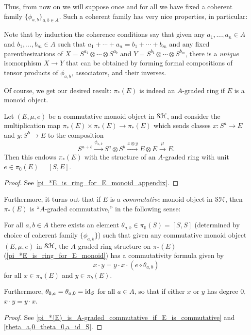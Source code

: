 \documentclass[../main.tex]{subfiles}
\begin{document}
Thus, from now on we will suppose once and for all we have fixed a coherent family $\{\phi_{a,b}\}_{a,b\in A}$. Such a coherent family has very nice properties, in particular:

\begin{remark}\label{unique_comp_Sas}
	Note that by induction the coherence conditions say that given any $a_1,\ldots,a_n\in A$ and $b_1,\ldots,b_m\in A$ such that $a_1+\cdots+a_n=b_1+\cdots+b_m$ and any fixed parenthesizations of $X=S^{a_1}\otimes\cdots\otimes S^{a_b}$ and $Y=S^{b_1}\otimes\cdots\otimes S^{b_m}$, there is a \emph{unique} isomorphism $X\to Y$ that can be obtained by forming formal compositions of tensor products of $\phi_{a,b}$, associators, and their inverses.
\end{remark}

Of course, we get our desired result: $\pi_*(E)$ is indeed an $A$-graded ring if $E$ is a monoid object.

\begin{proposition}\label{pi_*E_is_ring_for_E_monoid}
	Let $(E,\mu,e)$ be a commutative monoid object in $\mathcal{SH}$, and consider the multiplication map $\pi_*(E)\times\pi_*(E)\to\pi_*(E)$ which sends classes $x:S^a\to E$ and $y:S^b\to E$ to the composition
	\[S^{a+b}\xrightarrow{\phi_{a,b}}S^a\otimes S^b\xrightarrow{x\otimes y}E\otimes E\xrightarrow\mu E.\]
	Then this endows $\pi_*(E)$ with the structure of an $A$-graded ring with unit $e\in\pi_0(E)=[S,E]$.
\end{proposition}
\begin{proof}
	See \autoref{pi_*E_is_ring_for_E_monoid_appendix}.
\end{proof}

Furthermore, it turns out that if $E$ is a \emph{commutative} monoid object in $\mathcal{SH}$, then $\pi_\ast(E)$ is ``$A$-graded commutative,'' in the following sense:

\begin{proposition}
	For all $a,b\in A$ there exists an element $\theta_{a,b}\in\pi_0(S)=[S,S]$ (determined by choice of coherent family $\{\phi_{a,b}\}$) such that given any commutative monoid object $(E,\mu,e)$ in $\mathcal{SH}$, the $A$-graded ring structure on $\pi_\ast(E)$ (\autoref{pi_*E_is_ring_for_E_monoid}) has a commutativity formula given by
	\[x\cdot y=y\cdot x\cdot (e\circ\theta_{a,b})\]
	for all $x\in\pi_a(E)$ and $y\in\pi_b(E)$.
	
	Furthermore, $\theta_{0,a}=\theta_{a,0}=\mathrm{id}_S$ for all $a\in A$, so that if either $x$ or $y$ has degree $0$, $x\cdot y=y\cdot x$.
\end{proposition}
\begin{proof}
	See \autoref{pi_*(E)_is_A-graded_commutative_if_E_is_commutative} and \autoref{theta_a,0=theta_0,a=id_S}.
\end{proof}
\end{document}
